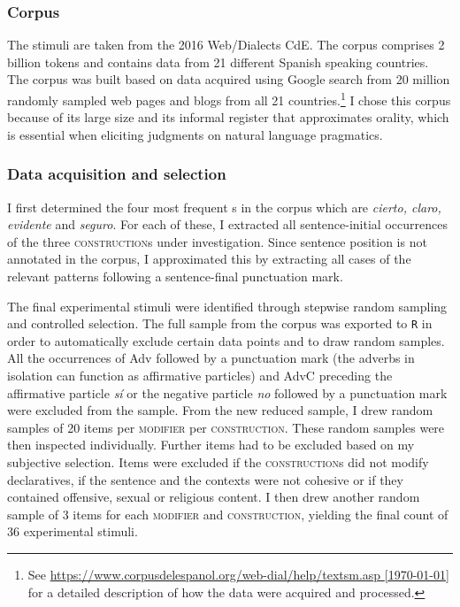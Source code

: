 \subsubsection{Corpus}
The stimuli are taken from the 2016 Web/Dialects CdE. The corpus comprises  2 billion tokens and contains data from 21 different Spanish speaking countries. The corpus was built based on data acquired using Google search from  20 million randomly sampled web pages and blogs from all 21 countries.\footnote{See \href{https://www.corpusdelespanol.org/web-dial/help/textsm.asp}{https://www.corpusdelespanol.org/web-dial/help/textsm.asp {[\today]}} for a detailed description of how the data were acquired and processed.} I chose this corpus because of its large size and its informal register that approximates orality,  which is essential when eliciting judgments on natural language pragmatics.

\subsubsection{Data acquisition and selection}
I first determined the four most frequent s in the corpus which are \emph{cierto, claro, evidente} and \emph{seguro}. For each of these, I extracted all sentence-initial occurrences of the three \textsc{construction}s under investigation. Since sentence position is not annotated in the corpus,  I  approximated this by extracting all cases of the relevant patterns following a sentence-final punctuation mark. 

The final experimental stimuli were identified through stepwise random sampling and controlled selection. The full sample from the corpus was exported to \verb|R| in order to  automatically exclude certain data points and to  draw random samples. All the occurrences of Adv followed by a punctuation mark (the adverbs in isolation can function as affirmative particles) and AdvC preceding the affirmative particle \textit{sí} or the negative particle \textit{no} followed by a punctuation mark were excluded from the sample. From the new reduced sample, I drew  random samples of 20 items per \textsc{modifier} per \textsc{construction}.  These random samples were then inspected individually. Further items had to be excluded based on my subjective selection. Items were excluded if the \textsc{construction}s did not modify declaratives, if the sentence and the contexts were not cohesive or if they contained offensive, sexual or religious content. I then drew another random sample of 3 items for each \textsc{modifier} and \textsc{construction}, yielding the final count of 36 experimental stimuli. 

